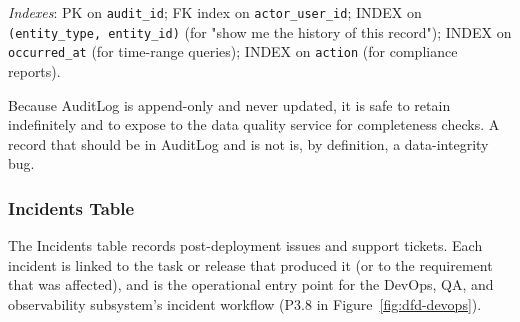 \documentclass[12pt,a4paper]{report}
\begin{document}
\noindent \emph{Indexes}: PK on \texttt{audit\_id}; FK index on
\texttt{actor\_user\_id}; INDEX on \texttt{(entity\_type, entity\_id)} (for
"show me the history of this record"); INDEX on \texttt{occurred\_at} (for
time-range queries); INDEX on \texttt{action} (for compliance reports).

Because AuditLog is append-only and never updated, it is safe to retain
indefinitely and to expose to the data quality service for completeness
checks. A record that should be in AuditLog and is not is, by definition, a
data-integrity bug.

\subsubsection{Incidents Table}
\label{tab:incidents}

The Incidents table records post-deployment issues and support tickets. Each
incident is linked to the task or release that produced it (or to the
requirement that was affected), and is the operational entry point for the
DevOps, QA, and observability subsystem's incident workflow (P3.8 in
Figure~\ref{fig:dfd-devops}).
\end{document}
